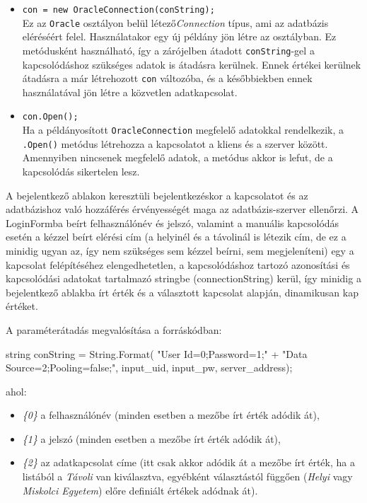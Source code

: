 \begin{itemize}
	\item \texttt{con = new OracleConnection(conString);}
		\\Ez az \texttt{Oracle} osztályon belül létező\textit{Connection} típus, ami az adatbázis eléréséért felel. Használatakor egy új példány jön létre az osztályban. Ez metódusként használható, így a zárójelben átadott \texttt{conString}-gel a kapcsolódáshoz szükséges adatok is átadásra kerülnek. Ennek értékei kerülnek átadásra a már létrehozott \texttt{con} változóba, és a későbbiekben ennek használatával jön létre a közvetlen adatkapcsolat.

	\item \texttt{con.Open();}
		\\Ha a példányosított \texttt{OracleConnection} megfelelő adatokkal rendelkezik, a \texttt{.Open()} metódus létrehozza a kapcsolatot a kliens és a szerver között. Amennyiben nincsenek megfelelő adatok, a metódus akkor is lefut, de a kapcsolódás sikertelen lesz.

\end{itemize}

\label{adatkapcsolat_parameterezese}
A bejelentkező ablakon keresztüli bejelentkezéskor a kapcsolatot és az adatbázishoz való hozzáférés érvényességét maga az adatbázis-szerver ellenőrzi. A LoginFormba beírt felhasználónév és jelszó, valamint a manuális kapcsolódás esetén a kézzel beírt elérési cím (a helyinél és a távolinál is létezik cím, de ez a minidig ugyan az, így nem szükséges sem kézzel beírni, sem megjeleníteni) egy a kapcsolat felépítéséhez elengedhetetlen, a kapcsolódáshoz tartozó azonosítási és kapcsolódási adatokat tartalmazó stringbe (connectionString) kerül, így minidig a bejelentkező ablakba írt érték és a választott kapcsolat alapján, dinamikusan kap értéket.
\par
A paraméterátadás megvalósítása a forráskódban:

\begin{cpp}
string conString = String.Format(
		   "User Id={0};Password={1};" +
		   "Data Source={2};Pooling=false;",
		   input_uid, input_pw, server_address);
\end{cpp}

ahol:
\begin{itemize}
	\item{\itshape \{0\}} a felhasználónév (minden esetben a mezőbe írt érték adódik át),
	\item{\itshape \{1\}} a jelszó (minden esetben a mezőbe írt érték adódik át),
	\item{\itshape \{2\}} az adatkapcsolat címe (itt csak akkor adódik át a mezőbe írt érték, ha a listából a \textit{Távoli} van kiválasztva, egyébként választástól függően (\textit{Helyi} vagy \textit{Miskolci Egyetem}) előre definiált értékek adódnak át).
\end{itemize}

